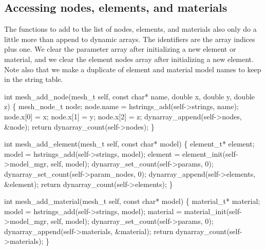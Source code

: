 \nwendcode{}\nwdocspar


\subsection{Accessing nodes, elements, and materials}

The functions to add to the list of nodes, elements, and materials
also only do a little more than append to dynamic arrays.  The identifiers
are the array indices plus one.  We clear the parameter array
after initializing a new element or material, and we clear the element
nodes array after initializing a new element.  Note also that we make
a duplicate of element and material model names to keep in the string table.

\nwenddocs{}\plusendmoddef
int mesh_add_node(mesh_t self, const char* name, double x, double y, double z)
\{
    mesh_node_t node;
    node.name = hstrings_add(self->strings, name);
    node.x[0] = x;
    node.x[1] = y;
    node.x[2] = z;
    dynarray_append(self->nodes, &node);
    return dynarray_count(self->nodes);
\}

\nwendcode{}\nwdocspar

\nwenddocs{}\plusendmoddef
int mesh_add_element(mesh_t self, const char* model)
\{
    element_t* element;
    model = hstrings_add(self->strings, model);
    element = element_init(self->model_mgr, self, model);
    dynarray_set_count(self->params, 0);
    dynarray_set_count(self->param_nodes, 0);
    dynarray_append(self->elements, &element);
    return dynarray_count(self->elements);
\}

\nwendcode{}\nwdocspar

\nwenddocs{}\plusendmoddef
int mesh_add_material(mesh_t self, const char* model)
\{
    material_t* material;
    model = hstrings_add(self->strings, model);
    material = material_init(self->model_mgr, self, model);
    dynarray_set_count(self->params, 0);
    dynarray_append(self->materials, &material);
    return dynarray_count(self->materials);
\}

